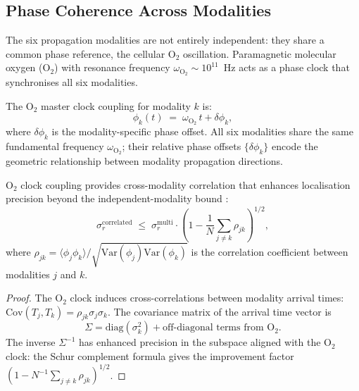 \subsection{Phase Coherence Across Modalities}

The six propagation modalities are not entirely independent: they share a
common phase reference, the cellular O$_2$ oscillation.  Paramagnetic
molecular oxygen (O$_2$) with resonance frequency
$\omega_\mathrm{O_2} \sim 10^{11}$~Hz acts as a phase clock that
synchronises all six modalities.

\begin{definition}
\label{def:o2-master}
The O$_2$ master clock coupling for modality $k$ is:
\begin{equation}
    \phi_k(t) \;=\; \omega_\mathrm{O_2}\,t + \delta\phi_k,
\end{equation}
where $\delta\phi_k$ is the modality-specific phase offset.  All six modalities
share the same fundamental frequency $\omega_\mathrm{O_2}$; their relative
phase offsets $\{\delta\phi_k\}$ encode the geometric relationship between
modality propagation directions.
\end{definition}

\begin{theorem}
\label{thm:cross-modality}
O$_2$ clock coupling provides cross-modality correlation that enhances
localisation precision beyond the independent-modality bound
:
\begin{equation}
    \sigma_r^\mathrm{correlated}
    \;\le\; \sigma_r^\mathrm{multi}
    \cdot \left(1 - \frac{1}{N}\sum_{j \ne k} \rho_{jk}\right)^{1/2},
\end{equation}
where $\rho_{jk} = \langle\phi_j\phi_k\rangle / \sqrt{\mathrm{Var}(\phi_j)
\mathrm{Var}(\phi_k)}$ is the correlation coefficient between modalities $j$
and $k$.
\end{theorem}

\begin{proof}
The O$_2$ clock induces cross-correlations between modality arrival times:
$\mathrm{Cov}(T_j, T_k) = \rho_{jk}\sigma_j\sigma_k$.  The covariance matrix
of the arrival time vector is
\[
    \Sigma = \mathrm{diag}(\sigma_k^2) + \text{off-diagonal terms from O$_2$}.
\]
The inverse $\Sigma^{-1}$ has enhanced precision in the subspace aligned with
the O$_2$ clock: the Schur complement formula gives the improvement factor
$(1 - N^{-1}\sum_{j \ne k}\rho_{jk})^{1/2}$.
\end{proof}

